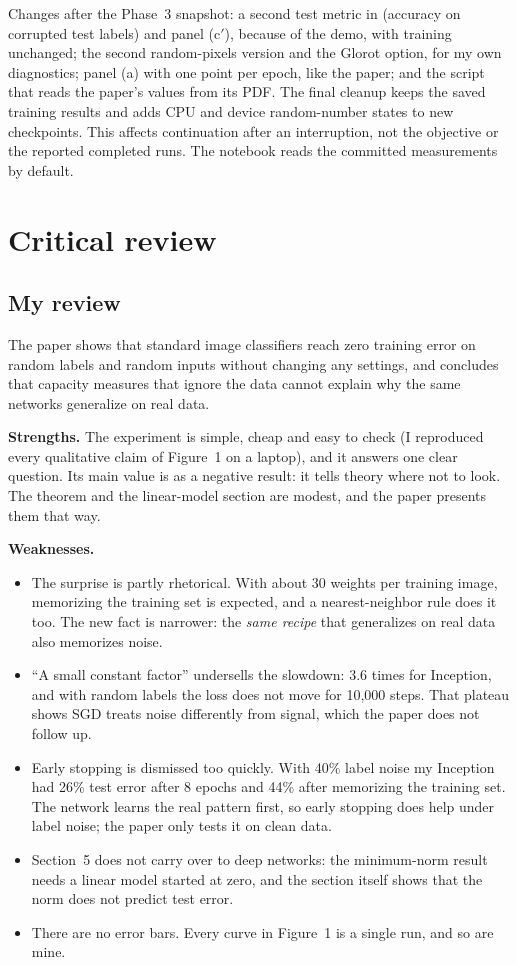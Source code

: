 Changes after the Phase~3 snapshot: a second test metric in  (accuracy on corrupted test labels) and panel (c$'$), because of the demo, with training unchanged; the second random-pixels version and the Glorot option, for my own diagnostics; panel (a) with one point per epoch, like the paper; and the script that reads the paper's values from its PDF. The final cleanup keeps the saved training results and adds CPU and device random-number states to new checkpoints. This affects continuation after an interruption, not the objective or the reported completed runs. The notebook reads the committed measurements by default.

\section{Critical review}

\subsection{My review}
The paper shows that standard image classifiers reach zero training error on random labels and random inputs without changing any settings, and concludes that capacity measures that ignore the data cannot explain why the same networks generalize on real data.

\textbf{Strengths.} The experiment is simple, cheap and easy to check (I reproduced every qualitative claim of Figure~1 on a laptop), and it answers one clear question. Its main value is as a negative result: it tells theory where not to look. The theorem and the linear-model section are modest, and the paper presents them that way.

\textbf{Weaknesses.}
\begin{itemize}
  \item The surprise is partly rhetorical. With about 30 weights per training image, memorizing the training set is expected, and a nearest-neighbor rule does it too. The new fact is narrower: the \emph{same recipe} that generalizes on real data also memorizes noise.
  \item ``A small constant factor'' undersells the slowdown: 3.6 times for Inception, and with random labels the loss does not move for 10{,}000 steps. That plateau shows SGD treats noise differently from signal, which the paper does not follow up.
  \item Early stopping is dismissed too quickly. With 40\% label noise my Inception had 26\% test error after 8 epochs and 44\% after memorizing the training set. The network learns the real pattern first, so early stopping does help under label noise; the paper only tests it on clean data.
  \item Section~5 does not carry over to deep networks: the minimum-norm result needs a linear model started at zero, and the section itself shows that the norm does not predict test error.
  \item There are no error bars. Every curve in Figure~1 is a single run, and so are mine.
\end{itemize}

